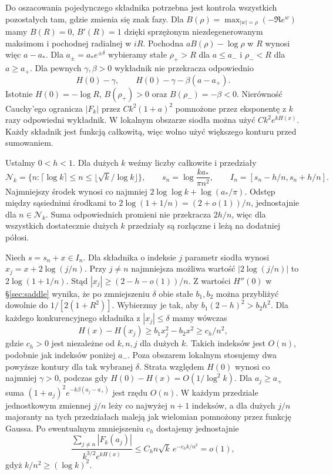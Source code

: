 \documentclass[11pt,a4paper,reqno]{amsart}
\numberwithin{equation}{section}
\begin{document}
Do oszacowania pojedynczego składnika potrzebna jest kontrola wszystkich pozostałych tam, gdzie zmienia się znak fazy. Dla \(B(\rho)=\max_{|w|=\rho}(-\Re e^w)\) mamy \(B(R)=0\), \(B'(R)=1\) dzięki sprzężonym niezdegenerowanym maksimom i pochodnej radialnej w \(iR\). Pochodna \(aB(\rho)-\log\rho\) w \(R\) wynosi więc \(a-a_*\). Dla \(a_\pm=a_*e^{\pm\delta}\) wybieramy stałe \(\rho_+>R\) dla \(a\le a_-\) i \(\rho_-<R\) dla \(a\ge a_+\). Dla pewnych \(\gamma,\beta>0\) wykładnik nie przekracza odpowiednio \[H(0)-\gamma,\qquad H(0)-\gamma-\beta(a-a_+).\] Istotnie \(H(0)=-\log R\), \(B(\rho_+)>0\) oraz \(B(\rho_-)=-\beta<0\). Nierówność Cauchy'ego ogranicza \(|F_k|\) przez \(Ck^2(1+a)^2\) pomnożone przez eksponentę z \(k\) razy odpowiedni wykładnik. W lokalnym obszarze siodła można użyć \(Ck^2e^{kH(x)}\). Każdy składnik jest funkcją całkowitą, więc wolno użyć większego konturu przed sumowaniem.

Ustalmy \(0<h<1\). Dla dużych \(k\) weźmy liczby całkowite i przedziały
\[
 \mathcal N_k=\{n:\lceil\log k\rceil\le n\le\lfloor\sqrt{k}/\log k\rfloor\},
 \qquad s_n=\log\frac{ka_*}{\pi n^2},\qquad I_n=[s_n-h/n,s_n+h/n].
\]
Najmniejszy środek wynosi co najmniej \(2\log\log k+\log(a_*/\pi)\). Odstęp między sąsiednimi środkami to \(2\log(1+1/n)=(2+o(1))/n\), jednostajnie dla \(n\in\mathcal N_k\). Suma odpowiednich promieni nie przekracza \(2h/n\), więc dla wszystkich dostatecznie dużych \(k\) przedziały są rozłączne i leżą na dodatniej półosi.

Niech \(s=s_n+x\in I_n\). Dla składnika o indeksie \(j\) parametr siodła wynosi \(x_j=x+2\log(j/n)\). Przy \(j\ne n\) najmniejsza możliwa wartość \(|2\log(j/n)|\) to \(2\log(1+1/n)\). Stąd \(|x_j|\ge(2-h-o(1))/n\). Z wartości \(H''(0)\) w \S\ref{sec:saddle} wynika, że po zmniejszeniu \(\delta\) obie stałe \(b_1,b_2\) można przybliżyć dowolnie do \(1/[2(1+R^2)]\). Wybierzmy je tak, aby \(b_1(2-h)^2>b_2h^2\). Dla każdego konkurencyjnego składnika z \(|x_j|\le\delta\) mamy wówczas
\[
 H(x)-H(x_j)\ge b_1x_j^2-b_2x^2\ge c_h/n^2,
\]
gdzie \(c_h>0\) jest niezależne od \(k,n,j\) dla dużych \(k\). Takich indeksów jest \(O(n)\), podobnie jak indeksów poniżej \(a_-\). Poza obszarem lokalnym stosujemy dwa powyższe kontury dla tak wybranej \(\delta\). Strata względem \(H(0)\) wynosi co najmniej \(\gamma>0\), podczas gdy \(H(0)-H(x)=O(1/\log^2 k)\). Dla \(a_j\ge a_+\) suma \((1+a_j)^2e^{-k\beta(a_j-a_+)}\) jest rzędu \(O(n)\). W każdym przedziale jednostkowym zmiennej \(j/n\) leży co najwyżej \(n+1\) indeksów, a dla dużych \(j/n\) majoranty na tych przedziałach maleją jak wielomian pomnożony przez funkcję Gaussa. Po ewentualnym zmniejszeniu \(c_h\) dostajemy jednostajnie
\[
 \frac{\sum_{j\ne n}|F_k(a_j)|}{k^{3/2}e^{kH(x)}}
 \le C_h n\sqrt{k}\,e^{-c_h k/n^2}=o(1),
\]
gdyż \(k/n^2\ge(\log k)^2\).
\end{document}
